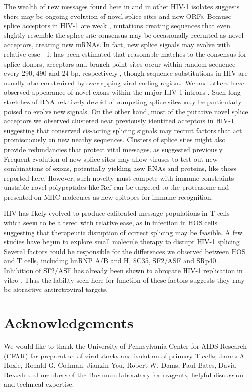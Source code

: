 \documentclass[../sherrill-Mix_thesis.tex]{subfiles}
\begin{document}
The wealth of new messages found here in \hivEight{} and in other HIV-1 isolates suggests there may be ongoing evolution of novel splice sites and new ORFs. Because splice acceptors in HIV-1 are weak \citep{Stoltzfus2009}, mutations creating sequences that even slightly resemble the \threePrime{} splice site consensus may be occasionally recruited as novel acceptors, creating new mRNAs. In fact, new splice signals may evolve with relative ease---it has been estimated that reasonable matches to the consensus for splice donors, acceptors and branch-point sites occur within random sequence every 290, 490 and 24 bp, respectively \citep{Burge1999}, though sequence substitutions in HIV are usually also constrained by overlapping viral coding regions. We and others have observed appearance of novel exons within the major HIV-1 introns \citep{Benko1990,Luetzelberger2006,Salfeld1990}. Such long stretches of RNA relatively devoid of competing splice sites may be particularly poised to evolve new signals. On the other hand, most of the putative novel splice acceptors we observed clustered near previously identified acceptors in HIV-1, suggesting that conserved cis-acting splicing signals may recruit factors that act promiscuously on new nearby sequences. Clusters of splice sites might also provide redundancies that protect vital messages, as suggested previously \citep{Abbink2008,Verhoef2001}. Frequent evolution of new splice sites may allow viruses to test out new combinations of exons, potentially yielding new RNAs and proteins, like those reported here. However, such novelty must compete with immune constraints---unstable novel polypeptides like Ref can be targeted to the proteasome and presented on MHC molecules as new epitopes for immune recognition.

HIV has likely evolved to produce calibrated message populations in T cells which seem to be altered with relative ease, as in infection in HOS cells, suggesting that therapeutic disruption of correct splicing may be feasible. A few studies have begun to explore small molecule therapy to disrupt HIV-1 splicing \citep{Bakkour2007,Tranell2011}. Several factors could be responsible for the differences we observed between HOS and T cells, including hnRNP A/B and H, SC35, SF2/ASF and SRp40 \citep{Caputi2004,Zahler2004}. Inhibition of SF2/ASF has already been shown to abrogate HIV-1 replication in vitro \citep{Bakkour2007}. Thus the lability seen here for function of these factors suggests they may be attractive antiretroviral targets. 

\section{Acknowledgements}
We would like to thank the University of Pennsylvania Center for AIDS Research (CFAR) for preparation of viral stocks and isolation of primary \cdFour{} T cells; James A. Hoxie, Ronald G. Collman, Jianxin You, Robert W. Doms, Paul Bates, David Rekosh and members of the Bushman laboratory for reagents, helpful discussion and technical expertise.
\end{document}
